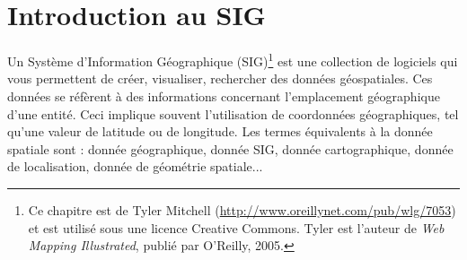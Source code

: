 \section{Introduction au SIG}\label{label_intro} 


Un Système d'Information Géographique (SIG)\cite{mitchel05}\footnote{Ce chapitre est de Tyler Mitchell (\url{http://www.oreillynet.com/pub/wlg/7053}) et est utilisé sous une licence Creative Commons. Tyler est l'auteur de \textit{Web Mapping Illustrated}, publié par O'Reilly, 2005.} est une collection de logiciels qui vous permettent de créer, visualiser, rechercher des données géospatiales. Ces données se réfèrent à des informations concernant l'emplacement géographique d'une entité. Ceci implique souvent l'utilisation de coordonnées géographiques, tel qu'une  valeur de latitude ou de longitude. Les termes équivalents à la donnée spatiale sont : donnée géographique, donnée SIG, donnée cartographique, donnée de localisation, donnée de géométrie spatiale...


